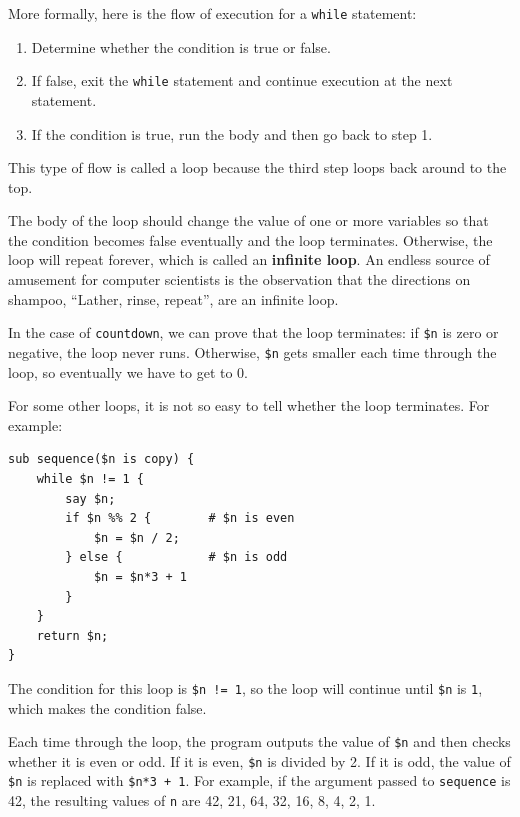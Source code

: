 More formally, here is the flow of execution for a {\tt while} statement:

\begin{enumerate}

\item Determine whether the condition is true or false.

\item If false, exit the {\tt while} statement
and continue execution at the next statement.

\item If the condition is true, run the
body and then go back to step 1.

\end{enumerate}

This type of flow is called a loop because the third step
loops back around to the top.  

The body of the loop should change the value of one or more variables
so that the condition becomes false eventually and the loop
terminates.  Otherwise, the loop will repeat forever, which is called
an {\bf infinite loop}.  An endless source of amusement for computer
scientists is the observation that the directions on shampoo,
``Lather, rinse, repeat'', are an infinite loop.

In the case of {\tt countdown}, we can prove that the loop
terminates: if {\tt \$n} is zero or negative, the loop never runs.
Otherwise, {\tt \$n} gets smaller each time through the
loop, so eventually we have to get to 0.

For some other loops, it is not so easy to tell whether the 
loop terminates.  For example:

\begin{verbatim}
sub sequence($n is copy) {
    while $n != 1 {
        say $n;
        if $n %% 2 {        # $n is even
            $n = $n / 2;
        } else {            # $n is odd
            $n = $n*3 + 1
        }
    }
    return $n;
}
\end{verbatim}
%
The condition for this loop is {\tt \$n != 1}, so the loop will continue
until {\tt \$n} is {\tt 1}, which makes the condition false.

Each time through the loop, the program outputs the value of {\tt \$n}
and then checks whether it is even or odd.  If it is even, {\tt \$n} is
divided by 2.  If it is odd, the value of {\tt \$n} is replaced with
{\tt \$n*3 + 1}. For example, if the argument passed to {\tt sequence}
is 42, the resulting values of {\tt n} are 42, 21, 64, 32, 16, 8, 4, 2, 1.

